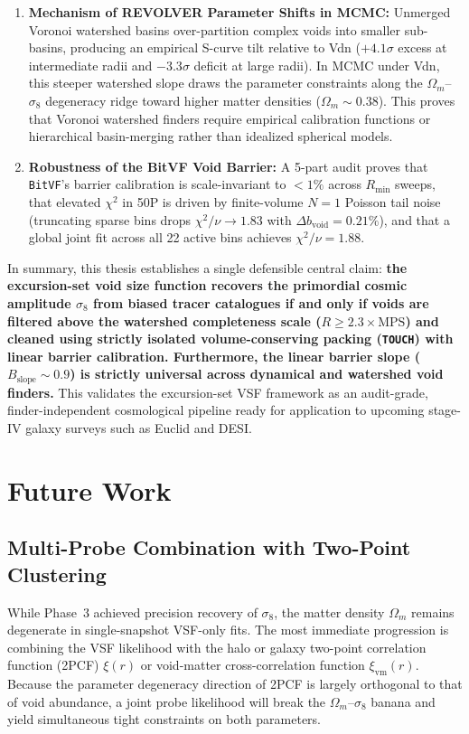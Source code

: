 \documentclass[12pt]{report}
\begin{document}
\begin{enumerate}
    \item \textbf{Mechanism of REVOLVER Parameter Shifts in MCMC:} Unmerged Voronoi watershed basins over-partition complex voids into smaller sub-basins, producing an empirical S-curve tilt relative to Vdn ($+4.1\sigma$ excess at intermediate radii and $-3.3\sigma$ deficit at large radii). In MCMC under Vdn, this steeper watershed slope draws the parameter constraints along the $\Omega_m$--$\sigma_8$ degeneracy ridge toward higher matter densities ($\Omega_m \sim 0.38$). This proves that Voronoi watershed finders require empirical calibration functions or hierarchical basin-merging rather than idealized spherical models.
    \item \textbf{Robustness of the BitVF Void Barrier:} A 5-part audit proves that \texttt{BitVF}'s barrier calibration is scale-invariant to $< 1\%$ across $R_{\mathrm{min}}$ sweeps, that elevated $\chi^2$ in 50P is driven by finite-volume $N=1$ Poisson tail noise (truncating sparse bins drops $\chi^2/\nu \rightarrow 1.83$ with $\Delta b_{\mathrm{void}} = 0.21\%$), and that a global joint fit across all 22 active bins achieves $\chi^2/\nu = 1.88$.
\end{enumerate}

In summary, this thesis establishes a single defensible central claim: \textbf{the excursion-set void size function recovers the primordial cosmic amplitude $\sigma_8$ from biased tracer catalogues if and only if voids are filtered above the watershed completeness scale ($R \ge 2.3 \times \mathrm{MPS}$) and cleaned using strictly isolated volume-conserving packing (\texttt{TOUCH}) with linear barrier calibration. Furthermore, the linear barrier slope ($B_{\mathrm{slope}} \sim 0.9$) is strictly universal across dynamical and watershed void finders.} This validates the excursion-set VSF framework as an audit-grade, finder-independent cosmological pipeline ready for application to upcoming stage-IV galaxy surveys such as Euclid and DESI.

\chapter{Future Work}
\label{chap:future_work}

\section{Multi-Probe Combination with Two-Point Clustering}

While Phase~3 achieved precision recovery of $\sigma_8$, the matter density $\Omega_m$ remains degenerate in single-snapshot VSF-only fits. The most immediate progression is combining the VSF likelihood with the halo or galaxy two-point correlation function (2PCF) $\xi(r)$ or void-matter cross-correlation function $\xi_{\mathrm{vm}}(r)$. Because the parameter degeneracy direction of 2PCF is largely orthogonal to that of void abundance, a joint probe likelihood will break the $\Omega_m$--$\sigma_8$ banana and yield simultaneous tight constraints on both parameters.
\end{document}
